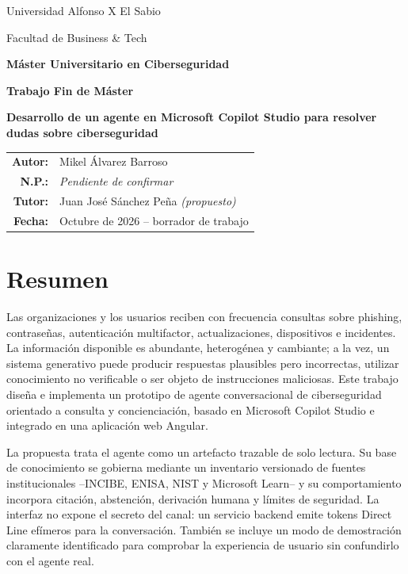 \documentclass[12pt,twoside,titlepage]{book}
\newcommand{\autor}{Mikel \'Alvarez Barroso}
\newcommand{\numeroexpediente}{\textit{Pendiente de confirmar}}
\newcommand{\tutor}{Juan Jos\'e S\'anchez Pe\~na \textit{(propuesto)}}
\newcommand{\titulo}{Desarrollo de un agente en Microsoft Copilot Studio para resolver dudas sobre ciberseguridad}
\newcommand{\fechaentrega}{Octubre de 2026 -- borrador de trabajo}
\begin{document}

\begin{titlepage}
\begin{center}
{\Large Universidad Alfonso X El Sabio\par}
\vspace{0.4cm}
{\Large Facultad de Business \& Tech\par}
\vspace{0.7cm}
{\large \textbf{M\'aster Universitario en Ciberseguridad}\par}
\vspace{2.3cm}
{\Large \textbf{Trabajo Fin de M\'aster}\par}
\vspace{1.6cm}
{\LARGE \textbf{\titulo}\par}
\vfill
\begin{tabular}{rl}
\textbf{Autor:} & \autor \\
\textbf{N.P.:} & \numeroexpediente \\
\textbf{Tutor:} & \tutor \\
\textbf{Fecha:} & \fechaentrega \\
\end{tabular}
\vspace{1.2cm}
\end{center}
\end{titlepage}

\frontmatter
\chapter*{Resumen}
Las organizaciones y los usuarios reciben con frecuencia consultas sobre phishing, contrase\~nas, autenticaci\'on multifactor, actualizaciones, dispositivos e incidentes. La informaci\'on disponible es abundante, heterog\'enea y cambiante; a la vez, un sistema generativo puede producir respuestas plausibles pero incorrectas, utilizar conocimiento no verificable o ser objeto de instrucciones maliciosas. Este trabajo dise\~na e implementa un prototipo de agente conversacional de ciberseguridad orientado a consulta y concienciaci\'on, basado en Microsoft Copilot Studio e integrado en una aplicaci\'on web Angular.

La propuesta trata el agente como un artefacto trazable de solo lectura. Su base de conocimiento se gobierna mediante un inventario versionado de fuentes institucionales --INCIBE, ENISA, NIST y Microsoft Learn-- y su comportamiento incorpora citaci\'on, abstenci\'on, derivaci\'on humana y l\'imites de seguridad. La interfaz no expone el secreto del canal: un servicio backend emite tokens Direct Line ef\'imeros para la conversaci\'on. Tambi\'en se incluye un modo de demostraci\'on claramente identificado para comprobar la experiencia de usuario sin confundirlo con el agente real.
\end{document}
